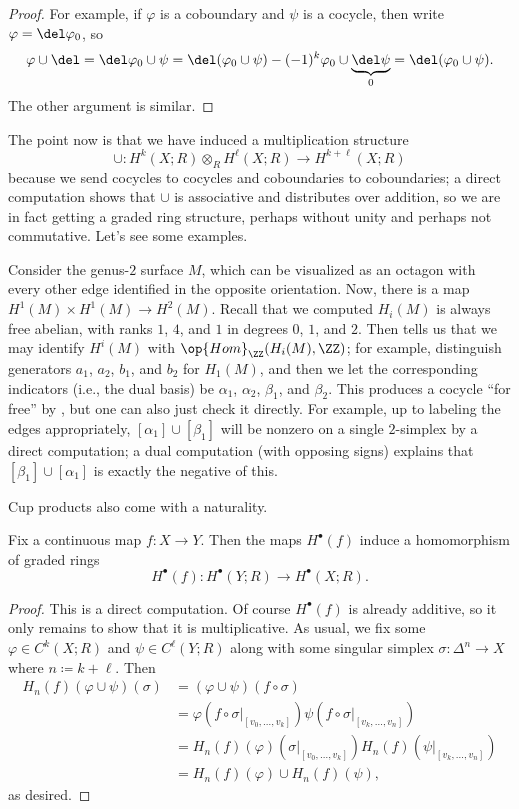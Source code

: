 \documentclass[../notes.tex]{subfiles}
\begin{document}
\begin{proof}
	For example, if $\varphi$ is a coboundary and $\psi$ is a cocycle, then write $\varphi=\del\varphi_0$, so
	\[\varphi\cup\del=\del\varphi_0\cup\psi=\del(\varphi_0\cup\psi)-(-1)^k\varphi_0\cup\underbrace{\del\psi}_0=\del(\varphi_0\cup\psi).\]
	The other argument is similar.
\end{proof}
The point now is that we have induced a multiplication structure
\[\cup\colon H^k(X;R)\otimes_RH^\ell(X;R)\to H^{k+\ell}(X;R)\]
because we send cocycles to cocycles and coboundaries to coboundaries; a direct computation shows that $\cup$ is associative and distributes over addition, so we are in fact getting a graded ring structure, perhaps without unity and perhaps not commutative. Let's see some examples.
\begin{example}
	Consider the genus-$2$ surface $M$, which can be visualized as an octagon with every other edge identified in the opposite orientation. Now, there is a map $H^1(M)\times H^1(M)\to H^2(M)$. Recall that we computed $H_i(M)$ is always free abelian, with ranks $1$, $4$, and $1$ in degrees $0$, $1$, and $2$. Then  tells us that we may identify $H^i(M)$ with $\op{Hom}_\ZZ(H_i(M),\ZZ)$; for example, distinguish generators $a_1$, $a_2$, $b_1$, and $b_2$ for $H_1(M)$, and then we let the corresponding indicators (i.e., the dual basis) be $\alpha_1$, $\alpha_2$, $\beta_1$, and $\beta_2$. This produces a cocycle ``for free'' by , but one can also just check it directly. For example, up to labeling the edges appropriately, $[\alpha_1]\cup[\beta_1]$ will be nonzero on a single $2$-simplex by a direct computation; a dual computation (with opposing signs) explains that $[\beta_1]\cup[\alpha_1]$ is exactly the negative of this.
\end{example}
Cup products also come with a naturality.
\begin{prop}
	Fix a continuous map $f\colon X\to Y$. Then the maps $H^\bullet(f)$ induce a homomorphism of graded rings
	\[H^\bullet(f)\colon H^\bullet(Y;R)\to H^\bullet(X;R).\]
\end{prop}
\begin{proof}
	This is a direct computation. Of course $H^\bullet(f)$ is already additive, so it only remains to show that it is multiplicative. As usual, we fix some $\varphi\in C^k(X;R)$ and $\psi\in C^\ell(Y;R)$ along with some singular simplex $\sigma\colon\Delta^n\to X$ where $n\coloneqq k+\ell$. Then
	\begin{align*}
		H_n(f)(\varphi\cup\psi)(\sigma) &= (\varphi\cup\psi)(f\circ\sigma) \\
		&= \varphi(f\circ\sigma|_{[v_0,\ldots,v_k]})\psi(f\circ\sigma|_{[v_k,\ldots,v_n]}) \\
		&= H_n(f)(\varphi)(\sigma|_{[v_0,\ldots,v_k]})H_n(f)(\psi|_{[v_k,\ldots,v_n]}) \\
		&= H_n(f)(\varphi)\cup H_n(f)(\psi),
	\end{align*}
	as desired.
\end{proof}
\end{document}
